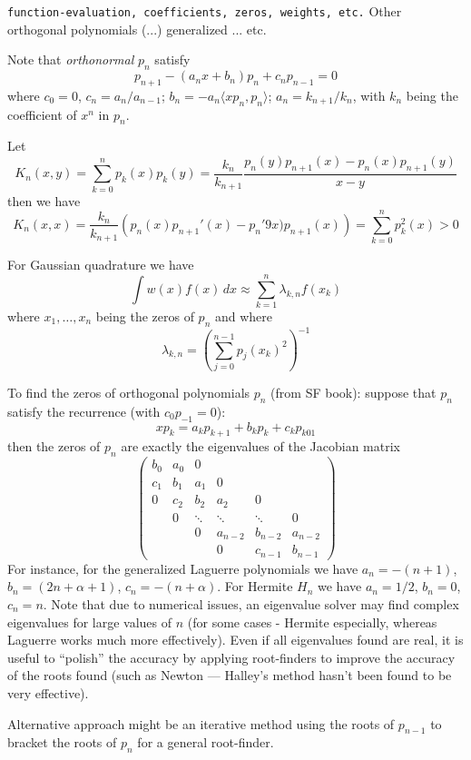 \documentclass[10pt,dvipdfmx,letterpaper,twoside]{article}
\let\al=\alpha
\let\lam=\lambda
\begin{document}
{\tt function-evaluation, coefficients, zeros, weights, etc.}
Other orthogonal polynomials (...) generalized ... etc.

Note that {\em orthonormal} $p_n$ satisfy
\[ p_{n+1} - (a_n x + b_n)p_n + c_n p_{n-1} = 0 \]
where $c_0=0$, $c_n = a_n / a_{n-1}$; $b_n = -a_n\langle x p_n, p_n \rangle$; $a_n = k_{n+1} / k_n$,
with $k_n$ being the coefficient of $x^n$ in $p_n$.

Let
\[ K_n(x,y) = \sum_{k=0}^n p_k(x) p_k(y) = \frac{k_n}{k_{n+1}} \frac{p_n(y)p_{n+1}(x) - p_n(x) p_{n+1}(y)}{x-y} \]
then we have
\[ K_n(x,x) = \frac{k_n}{k_{n+1}}\left( p_n(x) p_{n+1}'(x) - p_n'9x) p_{n+1}(x) \right) = \sum_{k=0}^n p_k^2(x) > 0 \]

For Gaussian quadrature we have
\[ \int w(x) f(x) \,dx \approx \sum_{k=1}^n \lam_{k,n} f(x_k) \]
where $x_1, \dots, x_n$ being the zeros of $p_n$ and where
\[ \lam_{k,n} = \left( \sum_{j=0}^{n-1} p_j(x_k)^2 \right)^{-1} \]

To find the zeros of orthogonal polynomials $p_n$ (from SF book):
suppose that $p_n$ satisfy the recurrence (with $c_0 p_{-1} = 0$):
\[ x p_k = a_k p_{k+1} + b_k p_k + c_k p_{k01} \]
then the zeros of $p_n$ are exactly the eigenvalues of the Jacobian matrix
\[\begin{pmatrix}
b_0 & a_0 &   0 \\
c_1 & b_1 & a_1 &  0 \\
  0 & c_2 & b_2 & a_2 &  0 \\
    &  0  & \ddots & \ddots & \ddots & 0\\
    &     &   0 & a_{n-2} & b_{n-2} & a_{n-2} \\
    &     &     &       0 & c_{n-1} & b_{n-1}
\end{pmatrix}\]
For instance, for the generalized Laguerre polynomials we have $a_n = -(n+1)$, $b_n = (2n+\al+1)$, $c_n = -(n+\al)$.
For Hermite $H_n$ we have $a_n = 1/2$, $b_n = 0$, $c_n = n$.
Note that due to numerical issues, an eigenvalue solver may find complex eigenvalues for large values of $n$
(for some cases - Hermite especially, whereas Laguerre works much more effectively).
Even if all eigenvalues found are real, it is useful to ``polish'' the accuracy by applying root-finders to improve the accuracy
of the roots found (such as Newton --- Halley's method hasn't been found to be very effective).

Alternative approach might be an iterative method using the roots of $p_{n-1}$ to bracket the roots of $p_n$ for a general root-finder.
\end{document}
